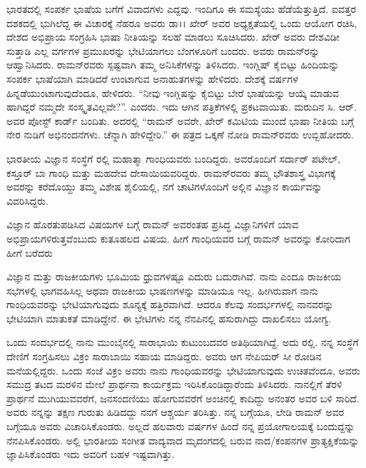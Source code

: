 ಭಾರತದಲ್ಲಿ ಸಂಪರ್ಕ ಭಾಷೆಯ ಬಗೆಗೆ ವಿವಾದಗಳು ಎದ್ದವು. ಇಂದಿಗೂ ಈ ಸಮಸ್ಯೆಯು ಹೆಡೆಯೆತ್ತುತ್ತಿದೆ. ಐವತ್ತರ ದಶಕದಲ್ಲಿ ಭುಗಿಲೆದ್ದ ಈ ವಿಚಾರಕ್ಕೆ ನೆಹರೂ ಅವರು ಡಾ।। ಖೇರ್ ಅವರ ಅಧ್ಯಕ್ಷತೆಯಲ್ಲಿ ಒಂದು ಆಯೋಗ ರಚಿಸಿ, ದೇಶದ ಅಭಿಪ್ರಾಯ ಸಂಗ್ರಹಿಸಿ ಭಾಷಾ ನೀತಿಯನ್ನು ಸಲಹೆ ಮಾಡಲು ಸೂಚಿಸಿದರು. ಖೇರ್ ಅವರು ದೇಶವಿಡೀ ಸುತ್ತಾಡಿ ಎಲ್ಲ ವರ್ಗಗಳ ಪ್ರಮುಖರನ್ನು ಭೇಟಿಯಾಗಲು ಬೆಂಗಳೂರಿಗೆ ಬಂದರು. ಅವರು ರಾಮನ್‍ರನ್ನು ಆಹ್ವಾನಿಸಿದರು. ರಾಮನ್‍ರವರು ಸ್ಪಷ್ಟವಾಗಿ ತಮ್ಮ ಅನಿಸಿಕೆಗಳನ್ನು ತಿಳಿಸಿದರು. ಇಂಗ್ಲಿಷ್ ಕೈಬಿಟ್ಟು ಹಿಂದಿಯನ್ನು ಸಂಪರ್ಕ ಭಾಷೆಯಾಗಿ ಮಾಡಿದರೆ ಉಂಟಾಗುವ ಅನಾಹುತಗಳನ್ನು ಹೇಳಿದರು. ದೇಶಕ್ಕೆ  ವರ್ಷಗಳ ಹಿನ್ನಡೆಯುಂಟಾಗುವುದೆಂದೂ, ಹೇಳಿದರು. “ನೀವು ಇಂಗ್ಲಿಷನ್ನು ಕೈಬಿಟ್ಟು ಬೇರೆ ಭಾಷೆಯನ್ನು ಆಯ್ಕೆ ಮಾಡುವ ಹಾಗಿದ್ದರೆ ನಮ್ಮದೇ ಸಂಸ್ಕೃತವಿಲ್ಲವೇ?”. ಎಂದರು. ಇದು ಆಗಿನ ಪತ್ರಿಕೆಗಳಲ್ಲಿ ಪ್ರಕಟವಾಯಿತು. ಮರುದಿನ ಸಿ. ಆರ್. ಅವರ ಪೋಸ್ಟ್ ಕಾರ್ಡ್ ಬಂದಿತು. ಅದರಲ್ಲಿ “ರಾಮನ್ ಅವರೇ, ಖೇರ್ ಕಮಿಟಿಯ ಮುಂದೆ ಭಾಷಾ ನೀತಿಯ ಬಗ್ಗೆ ನೇರ ನುಡಿಗೆ ಅಭಿನಂದನೆಗಳು. ಚೆನ್ನಾಗಿ ಹೇಳಿದ್ದೇರಿ.” ಈ ಪತ್ರದ ಒಕ್ಕಣೆ ನೋಡಿ ರಾಮನ್‍ರವರು ಉಬ್ಬಿಹೋದರು.



\vskip 3pt

ಭಾರತೀಯ ವಿಜ್ಞಾನ ಸಂಸ್ಥೆಗೆ ರಲ್ಲಿ ಮಹಾತ್ಮಾ ಗಾಂಧಿಯವರು ಬಂದಿದ್ದರು. ಅವರೊಂದಿಗೆ ಸರ್ದಾರ್ ಪಟೇಲ್, ಕಸ್ತೂರ್ ಬಾ ಗಾಂಧಿ ಮತ್ತು ಮಹದೇವ ದೇಸಾಯಿಯವರಿದ್ದರು. ರಾಮನ್‍\-ರವರು ತಮ್ಮ ಭೌತಶಾಸ್ತ್ರ ವಿಭಾಗಕ್ಕೆ ಅವರನ್ನು ಕರೆದೊಯ್ದು ತಮ್ಮ ವಿಶೇಷ ಶೈಲಿಯಲ್ಲಿ, ನಗೆ ಚಾಟಿಗಳೊಂದಿಗೆ ಅಲ್ಲಿನ ವಿಜ್ಞಾನ ಕಾರ್ಯವನ್ನು ವಿವರಿಸಿದ್ದರು.

\vskip 2pt

ವಿಜ್ಞಾನ ಹೊರತುಪಡಿಸಿದ ವಿಷಯಗಳ ಬಗ್ಗೆ ರಾಮನ್ ಅವರಂತಹ ಪ್ರಸಿದ್ಧ ವಿಜ್ಞಾನಿಗಳಿಗೆ ಯಾವ ಅಭಿಪ್ರಾಯಗಳಿರುತ್ತವೆಂಬುದು ಕುತೂಹಲದ ವಿಷಯ. ಹೀಗೆ ಗಾಂಧಿಯವರ ಬಗ್ಗೆ ರಾಮನ್ ಅವರನ್ನು ಕೋರಿದಾಗ ಹೀಗೆ ಬರೆದರು\enginline{-}

\vskip 2pt

ವಿಜ್ಞಾನ ಮತ್ತು ರಾಜಕೀಯಗಳು ಭೂಮಿಯ ಧ್ರುವಗಳಷ್ಟೂ ಎದುರು ಬದುರಾಗಿವೆ. ನಾನು ಎಂದೂ ರಾಜಕೀಯ ಸಭೆಗಳಲ್ಲಿ ಭಾಗವಹಿಸಿಲ್ಲ ಅಥವಾ ರಾಜಕೀಯ ಭಾಷಣಗಳನ್ನು ಮಾಡಿಯೂ ಇಲ್ಲ. ಹೀಗಿರುವಾಗ ನಾನು ಗಾಂಧಿಯವರನ್ನು ಭೇಟಿಯಾಗುವುದು ಶೂನ್ಯಕ್ಕೆ ಹತ್ತಿರವಾಗಿದೆ. ಆದರೂ ಕೆಲವು ಸಂದರ್ಭಗಳಲ್ಲಿ ನಾನವರನ್ನು ಭೇಟಿಯಾಗಿ ಮಾತುಕತೆ ಮಾಡಿದ್ದೇನೆ. ಈ ಭೇಟಿಗಳು ನನ್ನ ನೆನಪಿನಲ್ಲಿ ಹಸುರಾಗಿದ್ದು ದಾಖಲಿಸಲು ಯೋಗ್ಯ.

\vskip 2pt

ಒಂದು ಸಂದರ್ಭದಲ್ಲಿ ನಾನು ಮುಂಬೈನಲ್ಲಿ ಸಾರಾಭಾಯಿ ಕುಟುಂಬದವರ ಅತಿಥಿಯಾಗಿದ್ದೆ. ಅದು ರಲ್ಲಿ. ನನ್ನ ಸಂಸ್ಥೆಗೆ ದೇಣಿಗೆ ಸಂಗ್ರಹಿಸಲು ವಿಕ್ರಂ ಸಾರಾಬಾಯಿ ಸಹಾಯ ಮಾಡಿದ್ದರು. ಅವರು ಆಗ ನೇಪಿಯರ್ ಸೀ ರೋಡಿನ ಮನೆಯಲ್ಲಿದ್ದರು. ಒಂದು ಸಂಜೆ ವಿಕ್ರಂ ಅವರು ನಾನು ಗಾಂಧಿಯವರನ್ನು ಭೇಟಿಯಾಗುವುದು ಉಚಿತವೆಂದೂ, ಅವರು ಸಮುದ್ರ ತಟದ ಮರಳಿನ ಮೇಲೆ ಪ್ರಾರ್ಥನಾ ಕಾರ್ಯಕ್ರಮ ಇರಿಸಿಕೊಂಡಿದ್ದಾರೆಂದು ತಿಳಿಸಿದರು. ನಾನಲ್ಲಿಗೆ ತೆರಳಿ ಪ್ರಾರ್ಥನೆ ಮುಗಿಯುವವರೆಗೆ, ಜನಸಂದಣಿಯು ಹೋಗುವವರೆಗೆ ಅಂಚಿನಲ್ಲಿ ಕಾದಿದ್ದು ಅನಂತರ ಅವರ ಬಳಿ ಸಾರಿದೆ. ಅವರು ನನ್ನನ್ನು ತಕ್ಷಣ ಗುರುತು ಹಿಡಿದದ್ದು ನನಗೆ ಆಶ್ಚರ್ಯ ತರಿಸಿತ್ತು. ನನ್ನ ಬಗ್ಗೆಯೂ, ಲೇಡಿ ರಾಮನ್ ಅವರ ಬಗ್ಗೆಯೂ ಅವರು ವಿಚಾರಿಸಿಕೊಂಡರು. ಅಲ್ಲದೆ ಹಲವಾರು ವರ್ಷಗಳ ಹಿಂದೆ ನನ್ನ ಪ್ರಯೋಗಾಲಯಕ್ಕೆ ಬಂದುದ್ದನ್ನು ನೆನಪಿಸಿಕೊಂಡರು. ಅಲ್ಲಿ ಭಾರತೀಯ ಸಂಗೀತ ವಾದ್ಯವಾದ ಮೃದಂಗದಲ್ಲಿ ಬರುವ ನಾದ/ಕಂಪನಗಳ ಪ್ರಾತ್ಯಕ್ಷಿಕೆಯನ್ನು ಜ್ಞಾಪಿಸಿಕೊಂಡರು ಇದು ಅವರಿಗೆ ಬಹಳ ಇಷ್ಟವಾಗಿತ್ತು.


